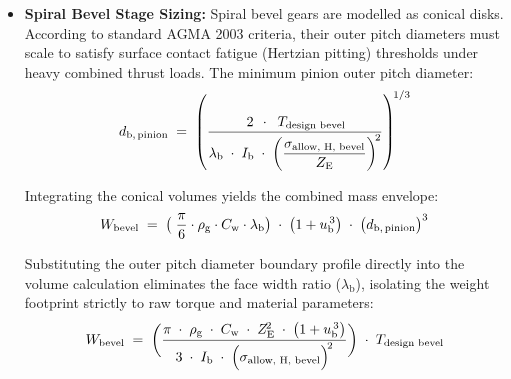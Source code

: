             \begin{itemize}
                \item \textbf{Spiral Bevel Stage Sizing:}
                Spiral bevel gears are modelled as conical disks. According to standard AGMA 2003 criteria, their outer 
                pitch diameters must scale to satisfy surface contact fatigue (Hertzian pitting) thresholds under heavy 
                combined thrust loads. The minimum pinion outer pitch diameter:
                    \begin{equation}
                        \label{eq:minpinionouterpitchdia}
                        d_{\text{b,\,pinion}}
                        \;=\;
                        \left(\frac{\,2\,\;\cdot\;\;T_{\text{design bevel}}}
                        {\lambda_{\text{b}}\;\cdot\; I_{\text{b}}\;\cdot\;
                        \left(\dfrac{\sigma_{\text{allow, H, bevel}}}{Z_{\text{E}}}\right)^{\!2}}\right)^{\!1/3}
                    \end{equation}

                Integrating the conical volumes yields the combined mass envelope:
                    \begin{equation}
                        \label{eq:massenvelopea}
                        W_{\text{bevel}}
                        \;=\;
                        \bigl(\;\frac{\pi}{6}\cdot \rho_{\text{g}}\cdot C_{\text{w}}\cdot \lambda_{\text{b}}
                        \bigr)\;\cdot\;
                        \bigl(1 + u_{\text{b}}^{\,3}\bigr)\;\cdot\;
                        \bigl(d_{\text{b,\,pinion}}\bigr)^{3}
                    \end{equation}

                Substituting the outer pitch diameter boundary profile directly into the volume calculation eliminates 
                the face width ratio ($\lambda_{\text{b}}$), isolating the weight footprint strictly to raw torque and 
                material parameters:
                    \begin{equation}
                        \label{eq:massenvelopeb}
                        W_{\text{bevel}}
                        \;=\;
                        \biggl(\frac{\pi\;\cdot\;\rho_{\text{g}}\;\cdot\;C_{\text{w}}\;\cdot\;
                        Z_{\text{E}}^{\!2}\;\cdot\;
                        \bigl(1 + u_{\text{b}}^{\,3}\bigr)}{3\;\cdot\;I_{\text{b}}\;\cdot\;
                        \Bigl(\sigma_{\text{allow, H, bevel}}\Bigr)^{\!2}}\biggr)\;\cdot\;T_{\text{design bevel}}
                    \end{equation}


\end{itemize}
